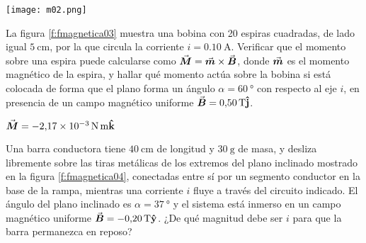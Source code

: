 %
\begin{center}
  \texttt{[image: m02.png]}
\end{center}
%
\begin{Exercise}\label{p:fmagnetica03}
  La figura \ref{f:fmagnetica03} muestra una bobina con 20 espiras cuadradas, de lado igual $\SI{5}{\centi\metre}$, por la que circula la corriente $i = \SI{0.10}{\ampere}$. Verificar que el momento sobre una espira puede calcularse como $\va*{M} = \va*{m} \times \va*{B}$, donde $\va*{m}$ es el momento magnético de la espira, y hallar qué momento actúa sobre la bobina si está colocada de forma que el plano forma un ángulo $\alpha = \SI{60}{\degree}$ con respecto al eje $i$, en presencia de un campo magnético uniforme $\va*{B} = \SI{0.50}{\tesla}\vu{j}$.
\end{Exercise}
\begin{Answer}
  $\va*{M} = \SI{-2.17E-3}{\newton . \metre}\vu{k}$
\end{Answer}
%
\begin{center}
\end{center}
%
\begin{Exercise}\label{p:fmagnetica04}
  Una barra conductora tiene $\SI{40}{\centi\metre}$ de longitud y $\SI{30}{\gram}$ de masa, y desliza libremente sobre las tiras metálicas de los extremos del plano inclinado mostrado en la figura \ref{f:fmagnetica04}, conectadas entre sí por un segmento conductor en la base de la rampa, mientras una corriente $i$ fluye a través del circuito indicado. El ángulo del plano inclinado es $\alpha = \SI{37}{\degree}$ y el sistema está inmerso en un campo magnético uniforme $\va*{B} = \SI{-0.20}{\tesla}\vu{y}$. ¿De qué magnitud debe ser $i$ para que la barra permanezca en reposo?
\end{Exercise}

